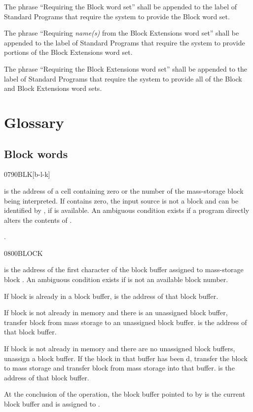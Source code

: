 The phrase ``Requiring the Block word set'' shall be appended to
the label of Standard Programs that require the system to provide
the Block word set.

The phrase ``Requiring \emph{name(s)} from the Block Extensions
word set'' shall be appended to the label of Standard Programs
that require the system to provide portions of the Block Extensions
word set.

The phrase ``Requiring the Block Extensions word set'' shall be
appended to the label of Standard Programs that require the system
to provide all of the Block and Block Extensions word sets.


\section{Glossary} %

\subsection{Block words} %

\begin{worddef}{0790}{BLK}[b-l-k]
\item {}

	 is the address of a cell containing zero or the
	number of the mass-storage block being interpreted. If
	 contains zero, the input source is not a block and
	can be identified by , if
	 is available. An ambiguous condition
	exists if a program directly alters the contents of .

\see {}.
\end{worddef}


\begin{worddef}{0800}{BLOCK}
\item {}

	 is the address of the first character of the
	block buffer assigned to mass-storage block . An
	ambiguous condition exists if  is not an available
	block number.

	If block  is already in a block buffer, 
	is the address of that block buffer.

	If block  is not already in memory and there is an
	unassigned block buffer, transfer block  from mass
	storage to an unassigned block buffer.  is the
	address of that block buffer.

	If block  is not already in memory and there are no
	unassigned block buffers, unassign a block buffer. If the block
	in that buffer has been d, transfer the block to
	mass storage and transfer block  from mass storage into
	that buffer.  is the address of that block buffer.

	At the conclusion of the operation, the block buffer pointed to
	by  is the current block buffer and is assigned to
	.
\end{worddef}



